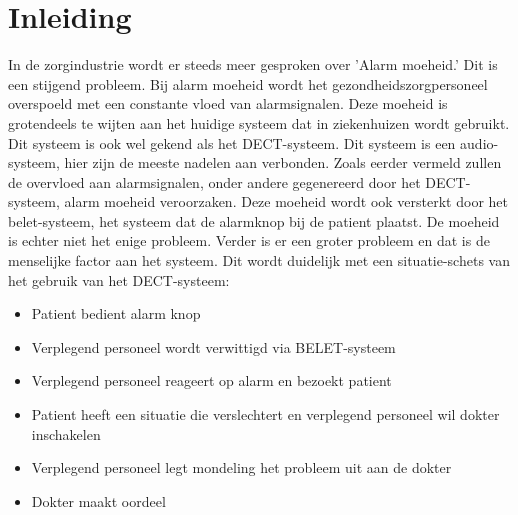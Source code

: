 


% 

\section{Inleiding}%
\label{sec:inleiding}

In de zorgindustrie wordt er steeds meer gesproken over 'Alarm moeheid.' Dit is een stijgend probleem. Bij alarm moeheid wordt het gezondheidszorgpersoneel overspoeld met een constante vloed van alarmsignalen. Deze moeheid is grotendeels te wijten aan het huidige systeem dat in ziekenhuizen wordt gebruikt. Dit systeem is ook wel gekend als het DECT-systeem. Dit systeem is een audio-systeem, hier zijn de meeste nadelen aan verbonden. Zoals eerder vermeld zullen de overvloed aan alarmsignalen, onder andere gegenereerd door het DECT-systeem, alarm moeheid veroorzaken. Deze moeheid wordt ook versterkt door het belet-systeem, het systeem dat de alarmknop bij de patient plaatst. De moeheid is echter niet het enige probleem. Verder is er een groter probleem en dat is de menselijke factor aan het systeem. Dit wordt duidelijk met een situatie-schets van het gebruik van het DECT-systeem:

\begin{itemize}
  \item Patient bedient alarm knop
  \item Verplegend personeel wordt verwittigd via BELET-systeem
  \item Verplegend personeel reageert op alarm en bezoekt patient
  \item Patient heeft een situatie die verslechtert en verplegend personeel wil dokter inschakelen
  \item Verplegend personeel legt mondeling het probleem uit aan de dokter
  \item Dokter maakt oordeel
\end{itemize}

